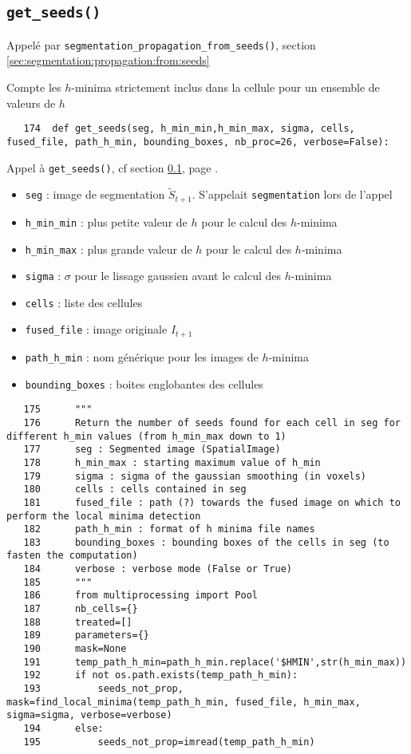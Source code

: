 \documentclass{article}
\def \mycolor {red}
\begin{document}
\subsection{\texttt{get\_seeds()}}
\label{sec:get:seeds}
\color{\mycolor}
Appel\'e par \texttt{segmentation\_propagation\_from\_seeds()},
section \ref{sec:segmentation:propagation:from:seeds}

Compte les $h$-minima strictement inclus dans la cellule pour un ensemble de valeurs de $h$
\color{black}
\begin{verbatim}
   174	def get_seeds(seg, h_min_min,h_min_max, sigma, cells, fused_file, path_h_min, bounding_boxes, nb_proc=26, verbose=False):
\end{verbatim} 
\color{\mycolor}
Appel \`a \texttt{get\_seeds()}, cf section \ref{sec:get:seeds}, page \pageref{sec:get:seeds}.
\begin{itemize}
\itemsep -1ex
\item \verb|seg| : image de segmentation $\tilde{S}_{t+1}$. S'appelait \verb|segmentation| lors de l'appel
\item \verb|h_min_min| : plus petite valeur de $h$ pour le calcul des $h$-minima
\item \verb|h_min_max| : plus grande valeur de $h$ pour le calcul des $h$-minima
\item \verb|sigma| : $\sigma$ pour le lissage gaussien avant le calcul des $h$-minima
\item \verb|cells| : liste des cellules
\item \verb|fused_file| : image originale $I_{t+1}$
\item \verb|path_h_min| : nom g\'en\'erique pour les images de $h$-minima
\item \verb|bounding_boxes| : boites englobantes des cellules
\end{itemize}
\color{black}
\begin{verbatim}  
   175	    """
   176	    Return the number of seeds found for each cell in seg for different h_min values (from h_min_max down to 1)
   177	    seg : Segmented image (SpatialImage)
   178	    h_min_max : starting maximum value of h_min
   179	    sigma : sigma of the gaussian smoothing (in voxels)
   180	    cells : cells contained in seg
   181	    fused_file : path (?) towards the fused image on which to perform the local minima detection
   182	    path_h_min : format of h minima file names
   183	    bounding_boxes : bounding boxes of the cells in seg (to fasten the computation)
   184	    verbose : verbose mode (False or True)
   185	    """
   186	    from multiprocessing import Pool
   187	    nb_cells={}
   188	    treated=[]
   189	    parameters={}
   190	    mask=None
   191	    temp_path_h_min=path_h_min.replace('$HMIN',str(h_min_max))
   192	    if not os.path.exists(temp_path_h_min):
   193	        seeds_not_prop, mask=find_local_minima(temp_path_h_min, fused_file, h_min_max, sigma=sigma, verbose=verbose)
   194	    else:
   195	        seeds_not_prop=imread(temp_path_h_min)
\end{verbatim} 
\end{document}
